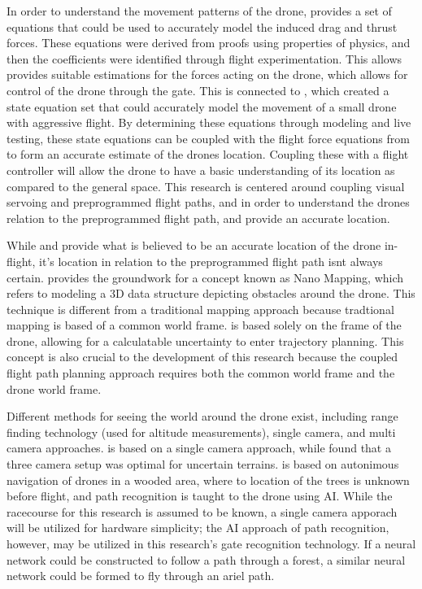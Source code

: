 \documentclass[onecolumn,10pt]{IEEEtran}
\begin{document}
In order to understand the movement patterns of the drone, \cite{svacha2017improving} provides a set of equations that could be used to accurately model the induced drag and thrust forces. These equations were derived from proofs using properties of physics, and then the coefficients were identified through flight experimentation. This allows provides suitable estimations for the forces acting on the drone, which allows for control of the drone through the gate. This is connected to \cite{loianno2017estimation}, which created a state equation set that could accurately model the movement of a small drone with aggressive flight. By determining these equations through modeling and live testing, these state equations can be coupled with the flight force equations from \cite{svacha2017improving} to form an accurate estimate of the drones location. Coupling these with a flight controller will allow the drone to have a basic understanding of its location as compared to the general space. This research is centered around coupling visual servoing and preprogrammed flight paths, and in order to understand the drones relation to the preprogrammed flight path, \cite{svacha2017improving} and \cite{loianno2017estimation} provide an accurate location. 

While \cite{svacha2017improving} and \cite{loianno2017estimation} provide what is believed to be an accurate location of the drone in-flight, it’s location in relation to the preprogrammed flight path isnt always certain. \cite{florence2018nanomap} provides the groundwork for a concept known as Nano Mapping, which refers to modeling a 3D data structure depicting obstacles around the drone. This technique is different from a traditional mapping approach because tradtional mapping is based of a common world frame. \cite{florence2018nanomap} is based solely on the frame of the drone, allowing for a calculatable uncertainty to enter trajectory planning. This concept is also crucial to the development of this research because the coupled flight path planning approach requires both the common world frame and the drone world frame.

Different methods for seeing the world around the drone exist, including range finding technology (used for altitude measurements), single camera, and multi camera approaches. \cite{loianno2017estimation} is based on a single camera approach, while \cite{zhilenkov2018use} found that a three camera setup was optimal for uncertain terrains. \cite{zhilenkov2018use} is based on autonimous navigation of drones in a wooded area, where to location of the trees is unknown before flight, and path recognition is taught to the drone using AI. While the racecourse for this research is assumed to be known, a single camera apporach will be utilized for hardware simplicity; the AI approach of path recognition, however, may be utilized in this research’s gate recognition technology. If a neural network could be constructed to follow a path through a forest, a similar neural network could be formed to fly through an ariel path.
\end{document}
